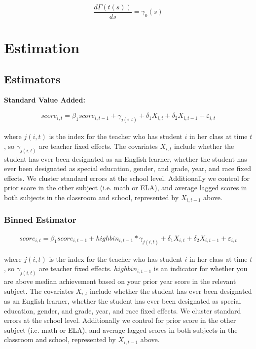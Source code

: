 \documentclass{article}
\theoremstyle{definition}
\theoremstyle{definition}
\theoremstyle{definition}
\theoremstyle{definition}
\begin{document}
    $$ \frac{d \Gamma(t(s)) }{ ds} = \gamma_0(s) $$
    



\section{Estimation}

    \subsection{Estimators}
    \noindent \textbf{Standard Value Added:}
    
    \begin{align*}
        score_{i,t} = \beta_1 score_{i,t-1} + \gamma_{j(i, t)} + \delta_1 X_{i, t} + \delta_2 X_{i, t-1} + \varepsilon_{i, t}
    \end{align*}
    
    \noindent where $j(i, t)$ is the index for the teacher who has student $i$ in her class at time $t$, so $\gamma_{j(i, t)}$ are teacher fixed effects. The covariates $X_{i, t}$ include whether the student has ever been designated as an English learner, whether the student has ever been designated as special education, gender, and grade, year, and race fixed effects. We cluster standard errors at the school level. Additionally we control for prior score in the other subject (i.e. math or ELA), and average lagged scores in both subjects in the classroom and school, represented by $X_{i, t-1}$ above.

        \subsubsection{Binned Estimator}
        
        \begin{align*}
            score_{i,t} = \beta_1 score_{i,t-1} + highbin_{i,t-1}*\gamma_{j(i, t)} + \delta_1 X_{i, t} + \delta_2 X_{i, t-1} + \varepsilon_{i, t}
        \end{align*}
        
        \noindent where $j(i, t)$ is the index for the teacher who has student $i$ in her class at time $t$, so $\gamma_{j(i, t)}$ are teacher fixed effects. $highbin_{i,t-1}$ is an indicator for whether you are above median achievement based on your prior year score in the relevant subject. The covariates $X_{i, t}$ include whether the student has ever been designated as an English learner, whether the student has ever been designated as special education, gender, and grade, year, and race fixed effects. We cluster standard errors at the school level. Additionally we control for prior score in the other subject (i.e. math or ELA), and average lagged scores in both subjects in the classroom and school, represented by $X_{i, t-1}$ above.
\end{document}
